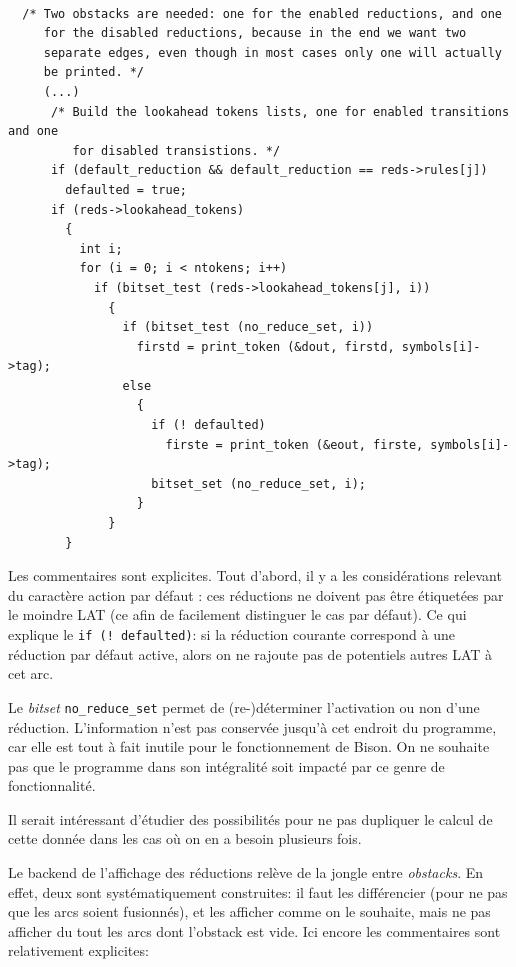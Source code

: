 \documentclass[a4paper,11pt,twoside,final]{article}
\begin{document}
  \begin{verbatim}

  /* Two obstacks are needed: one for the enabled reductions, and one
     for the disabled reductions, because in the end we want two
     separate edges, even though in most cases only one will actually
     be printed. */
     (...)
      /* Build the lookahead tokens lists, one for enabled transitions and one
         for disabled transistions. */
      if (default_reduction && default_reduction == reds->rules[j])
        defaulted = true;
      if (reds->lookahead_tokens)
        {
          int i;
          for (i = 0; i < ntokens; i++)
            if (bitset_test (reds->lookahead_tokens[j], i))
              {
                if (bitset_test (no_reduce_set, i))
                  firstd = print_token (&dout, firstd, symbols[i]->tag);
                else
                  {
                    if (! defaulted)
                      firste = print_token (&eout, firste, symbols[i]->tag);
                    bitset_set (no_reduce_set, i);
                  }
              }
        }
  \end{verbatim}

  Les commentaires sont explicites. Tout d'abord, il y a les considérations
  relevant du caractère \og action par défaut \fg: ces réductions ne doivent
  pas être étiquetées par le moindre LAT (ce afin de facilement distinguer le
  cas par défaut). Ce qui explique le \texttt{if (! defaulted)}: si la
  réduction courante correspond à une réduction par défaut active, alors on ne
  rajoute pas de potentiels autres LAT à cet arc.

  Le \textit{bitset} \texttt{no\_reduce\_set} permet de (re-)déterminer
  l'activation ou non d'une réduction. L'information n'est pas conservée
  jusqu'à cet endroit du programme, car elle est tout à fait inutile pour le
  fonctionnement de Bison. On ne souhaite pas que le programme dans son
  intégralité soit impacté par ce genre de fonctionnalité.

  Il serait intéressant d'étudier des possibilités pour ne pas dupliquer le
  calcul de cette donnée dans les cas où on en a besoin plusieurs fois.

  Le backend de l'affichage des réductions relève de la jongle entre
  \textit{obstacks}. En effet, deux sont systématiquement construites: il faut
  les différencier (pour ne pas que les arcs soient fusionnés), et les afficher
  comme on le souhaite, mais ne pas afficher du tout les arcs dont l'obstack
  est vide. Ici encore les commentaires sont relativement explicites:
\end{document}

